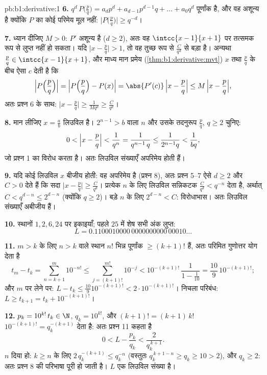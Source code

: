 \begin{solution}{pb:b1:derivative:1}
\textbf{6.} $q^d\,P\bigl(\frac pq\bigr) = a_d p^d + a_{d-1} p^{d-1} q +
\dots + a_0 q^d$ पूर्णांक है, और वह अशून्य है क्योंकि $P$ का कोई परिमेय मूल
नहीं: $\bigl|P\bigl(\frac pq\bigr)\bigr| \geq q^{-d}$।

\textbf{7.} ध्यान दीजिए $M > 0$: $P'$ अशून्य  है ($d \geq 2$), अतः वह
$\intcc{x-1}{x+1}$ पर तत्समक रूप से लुप्त नहीं हो सकता। यदि $\bigl|x - \frac
pq\bigr| > 1$, तो वह तुच्छ रूप से $\frac{C}{q^d}$ से बड़ा है। अन्यथा $\frac
pq \in \intcc{x-1}{x+1}$, और माध्य मान प्रमेय (\cref{thm:b1:derivative:mvt})
$x$ तथा $\frac pq$ के बीच ऐसा $c$ देती है कि
\[
\Bigl|P\Bigl(\frac pq\Bigr)\Bigr|
= \Bigl|P\Bigl(\frac pq\Bigr) - P(x)\Bigr|
= \abs{P'(c)}\,\Bigl|x - \frac pq\Bigr|
\leq M\,\Bigl|x - \frac pq\Bigr| ,
\]
अतः प्रश्न 6 के साथ: $\bigl|x - \frac pq\bigr| \geq \frac{1}{Mq^d} \geq
\frac{C}{q^d}$।

\textbf{8.} मान लीजिए $x = \frac ab$ लिउविल है। $2^{n-1} > b$ वाला $n$ और
उसके तदनुरूप $\frac pq$, $q \geq 2$ चुनिए:
\[
0 < \Bigl|x - \frac pq\Bigr| < \frac{1}{q^n}
= \frac{1}{q^{n-1}\,q} \leq \frac{1}{2^{n-1} q} <
\frac{1}{bq} ,
\]
जो प्रश्न 1 का विरोध करता है। अतः लिउविल संख्याएँ अपरिमेय होती हैं।

\textbf{9.} यदि कोई लिउविल $x$ बीजीय होती: वह अपरिमेय है (प्रश्न 8), अतः
प्रश्न 5--7 ऐसे $d \geq 2$ और $C > 0$ देते हैं कि सदा $\bigl|x - \frac
pq\bigr| \geq \frac{C}{q^d}$। प्रत्येक $n$ के लिए लिउविल सन्निकटक
$\frac{C}{q^d} < q^{-n}$ देता है, अर्थात् $C < q^{d-n} \leq 2^{d-n}$
(क्योंकि $q \geq 2$)। बड़े $n$ के लिए $2^{d-n} < C$: विरोधाभास। अतः लिउविल
संख्याएँ अबीजीय हैं।

\textbf{10.} स्थानों $1, 2, 6, 24$ पर इकाइयाँ; पहले $25$ में शेष सभी अंक
लुप्त:
\[
L = 0.1100010000\,0000000000\,00010\dots
\]

\textbf{11.} $m > k$ के लिए $n > k$ वाले स्थान $n!$ भिन्न पूर्णांक $\geq
(k+1)!$ हैं, अतः परिमित गुणोत्तर योग देता है
\[
t_m - t_k = \sum_{n=k+1}^{m} 10^{-n!}
\leq \sum_{j = (k+1)!}^{m!} 10^{-j}
< 10^{-(k+1)!}\,\frac{1}{1 - \frac1{10}}
= \frac{10}{9}\,10^{-(k+1)!} ;
\]
और $m$ पर  लेने पर: $L - t_k \leq \frac{10}{9}10^{-(k+1)!} <
2\cdot10^{-(k+1)!}$। निचला परिबंध: $L \geq t_{k+1} = t_k + 10^{-(k+1)!}$।

\textbf{12.} $p_k = 10^{k!}\,t_k \in \N$, $q_k = 10^{k!}$, और $(k+1)! =
(k+1)\,k!$ $10^{-(k+1)!} = q_k^{-(k+1)}$ देता है: अतः प्रश्न 11 कहता है
\[
0 < L - \frac{p_k}{q_k} < \frac{2}{q_k^{\,k+1}} .
\]
$n$ दिया हो: $k \geq n$ के लिए $2\,q_k^{-(k+1)} \leq q_k^{-n}$ (वस्तुतः
$q_k^{\,k+1-n} \geq q_k \geq 10 > 2$), और $q_k \geq 2$: अतः प्रश्न 8 की
परिभाषा पूरी हो जाती है। $L$ एक लिउविल संख्या है।


\end{solution}
